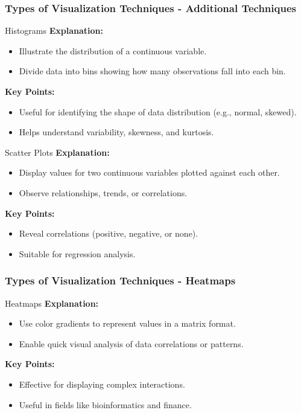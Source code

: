 \documentclass[aspectratio=169]{beamer}
\begin{document}
\begin{frame}[fragile]
  \frametitle{Types of Visualization Techniques - Additional Techniques}
  \begin{block}{Histograms}
    \textbf{Explanation:}
    \begin{itemize}
      \item Illustrate the distribution of a continuous variable.
      \item Divide data into bins showing how many observations fall into each bin.
    \end{itemize}

    \textbf{Key Points:}
    \begin{itemize}
      \item Useful for identifying the shape of data distribution (e.g., normal, skewed).
      \item Helps understand variability, skewness, and kurtosis.
    \end{itemize}
  \end{block}

  \begin{block}{Scatter Plots}
    \textbf{Explanation:}
    \begin{itemize}
      \item Display values for two continuous variables plotted against each other.
      \item Observe relationships, trends, or correlations.
    \end{itemize}

    \textbf{Key Points:}
    \begin{itemize}
      \item Reveal correlations (positive, negative, or none).
      \item Suitable for regression analysis.
    \end{itemize}
  \end{block}
\end{frame}

\begin{frame}[fragile]
  \frametitle{Types of Visualization Techniques - Heatmaps}
  \begin{block}{Heatmaps}
    \textbf{Explanation:}
    \begin{itemize}
      \item Use color gradients to represent values in a matrix format.
      \item Enable quick visual analysis of data correlations or patterns.
    \end{itemize}

    \textbf{Key Points:}
    \begin{itemize}
      \item Effective for displaying complex interactions.
      \item Useful in fields like bioinformatics and finance.
    \end{itemize}
  \end{block}
\end{frame}
\end{document}
